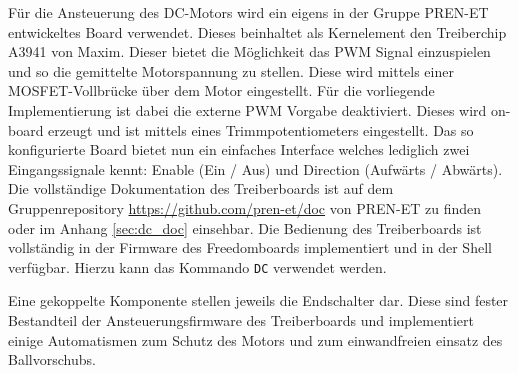 Für die Ansteuerung des DC-Motors wird ein eigens in der Gruppe
PREN-ET entwickeltes Board verwendet. Dieses beinhaltet als
Kernelement den Treiberchip A3941 von Maxim. Dieser bietet die
Möglichkeit das PWM Signal einzuspielen und so die gemittelte
Motorspannung zu stellen. Diese wird mittels einer
MOSFET-Vollbrücke über dem Motor eingestellt. Für die vorliegende
Implementierung ist dabei die externe PWM Vorgabe deaktiviert.
Dieses wird on-board erzeugt und ist mittels eines
Trimmpotentiometers eingestellt. Das so konfigurierte Board
bietet nun ein einfaches Interface welches lediglich zwei
Eingangssignale kennt: Enable (Ein / Aus) und Direction (Aufwärts
/ Abwärts).
%
%
Die vollständige Dokumentation des Treiberboards ist auf dem
Gruppenrepository \url{https://github.com/pren-et/doc}
von PREN-ET zu finden oder im Anhang \ref{sec:dc_doc} einsehbar.
Die Bedienung des Treiberboards ist vollständig in der Firmware des
Freedomboards implementiert und in der Shell verfügbar. Hierzu kann
das Kommando \verb!DC! verwendet werden.

Eine gekoppelte Komponente stellen jeweils die Endschalter dar.
Diese sind fester Bestandteil der Ansteuerungsfirmware des
Treiberboards und implementiert einige Automatismen zum Schutz
des Motors und zum einwandfreien einsatz des Ballvorschubs.
